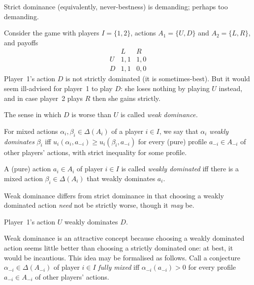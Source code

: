 Strict dominance (equivalently, never-bestness) is demanding; perhaps too demanding.

\begin{example}
	\label{example:idwds}
	Consider the game with players $I = \{1,2\}$, actions $A_1 = \{U,D\}$ and $A_2 = \{L,R\}$, and payoffs
	\begin{equation*}
		\begin{array}{c|cc}
			  & L   & R   \\ \hline
			U & 1,1 & 1,0 \\
			D & 1,1 & 0,0
		\end{array}
	\end{equation*}
	Player~1's action $D$ is not strictly dominated (it is sometimes-best). But it would seem ill-advised for player~1 to play $D$: she loses nothing by playing $U$ instead, and in case player~2 plays $R$ then she gains strictly.
\end{example}

The sense in which $D$ is worse than $U$ is called \emph{weak dominance.}

\begin{definition}
	\label{definition:dominates_weak}
	For mixed actions $\alpha_i,\beta_i \in \Delta(A_i)$ of a player $i \in I$, we say that $\alpha_i$ \emph{weakly dominates} $\beta_i$ iff $u_i(\alpha_i,a_{-i}) \geq u_i(\beta_i,a_{-i})$ for every (pure) profile $a_{-i} \in A_{-i}$ of other players' actions, with strict inequality for some profile.
\end{definition}

\begin{definition}
	\label{definition:dominated_weak}
	A (pure) action $a_i \in A_i$ of player $i \in I$ is called \emph{weakly dominated} iff there is a mixed action $\beta_i \in \Delta(A_i)$ that weakly dominates $a_i$.
\end{definition}

Weak dominance differs from strict dominance in that choosing a weakly dominated action \emph{need} not be strictly worse, though it \emph{may} be.

\addtocounter{example}{-1}
\begin{example}[continued]
	\label{example:idwds_def}
	Player~1's action $U$ weakly dominates $D$.
\end{example}

Weak dominance is an attractive concept because choosing a weakly dominated action seems little better than choosing a strictly dominated one: at best, it would be incautious. This idea may be formalised as follows. Call a conjecture $\alpha_{-i} \in \Delta(A_{-i})$ of player $i \in I$ \emph{fully mixed} iff $\alpha_{-i}(a_{-i})>0$ for every profile $a_{-i} \in A_{-i}$ of other players' actions.

